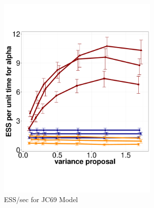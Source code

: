   \begin{figure}%
  \begin{minipage}[!hp]{0.45\linewidth}
  \centering
    \includegraphics [width=0.70\textwidth, angle=0]{figs/jc.pdf}
    \vspace{-0 in}
    \caption{ESS/sec for JC69 Model }
     \label{fig:ESS_JC}
  \end{minipage}
  \end{figure}



